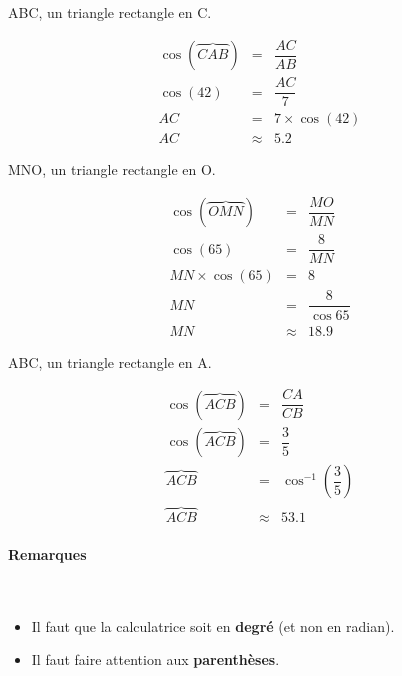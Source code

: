 \documentclass[paper=a4, fontsize=11pt]{scrartcl} %
\begin{document}
\begin{multicols}{3}

  ABC, un triangle rectangle en C.

  \begin{eqnarray*}
    \cos(\overbrace{CAB}) &=& \dfrac{AC}{AB}             \\
    \cos(42)              &=& \dfrac{AC}{7}              \\
    AC                    &=& 7 \times \cos(42)          \\
    AC                    & \approx & 5.2
  \end{eqnarray*}
  
  \vspace{1cm}
  
  MNO, un triangle rectangle en O.

    \begin{eqnarray*}
      \cos(\overbrace{OMN}) &=& \dfrac{MO}{MN}           \\  
      \cos(65)              &=& \dfrac{8}{MN}            \\
      MN \times \cos(65)    &=& 8                        \\
      MN                    &=& \dfrac{8}{\cos{65}}      \\
      MN                    & \approx & 18.9
    \end{eqnarray*}

  ABC, un triangle rectangle en A.

  \begin{eqnarray*}
    \cos(\overbrace{ACB}) &=& \dfrac{CA}{CB}                       \\
    \cos(\overbrace{ACB}) &=& \dfrac{3}{5}                         \\
    \overbrace{ACB}       &=& \cos^{-1} \left( \dfrac{3}{5} \right) \\
    \overbrace{ACB}       &\approx& 53.1
  \end{eqnarray*}
  
  \end{multicols}   
  
    \paragraph{Remarques}~~\\
  \begin{itemize}
  \item Il faut que la calculatrice soit en \textbf{degré} (et non en radian).
  \item Il faut faire attention aux \textbf{parenthèses}.
  \end{itemize}
\end{document}
